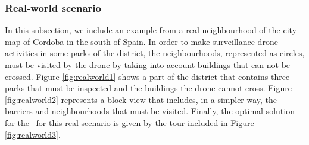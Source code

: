 \documentclass[a4paper,  review, authoryear, 1p.]{elsarticle}
\newcommand{\TSPN}{{\sf{H-TSPN}\xspace }}
\newcommand{\JP}[1]{{\color{armygreen}#1}}
\newcommand{\CV}[1]{{\color{red}#1}}
\begin{document}
	
	\CV{
		\subsubsection{Real-world scenario}
		In this subsection,	we include an example from a real neighbourhood of the city map of Cordoba in the south of Spain. In order to make surveillance drone activities in some parks of the district, the neighbourhoods, represented as circles, must be visited by the drone by taking into account buildings that can not be crossed. Figure \ref{fig:realworld1} shows a part of the district that contains three parks that must be inspected and the buildings the drone cannot cross. Figure \ref{fig:realworld2} represents a block view that includes, in a simpler way, the barriers and neighbourhoods that must be visited. Finally, the optimal solution for the \TSPN \ for this real scenario is given by the \JP{tour} included in Figure \ref{fig:realworld3}.
		
}
\end{document}
